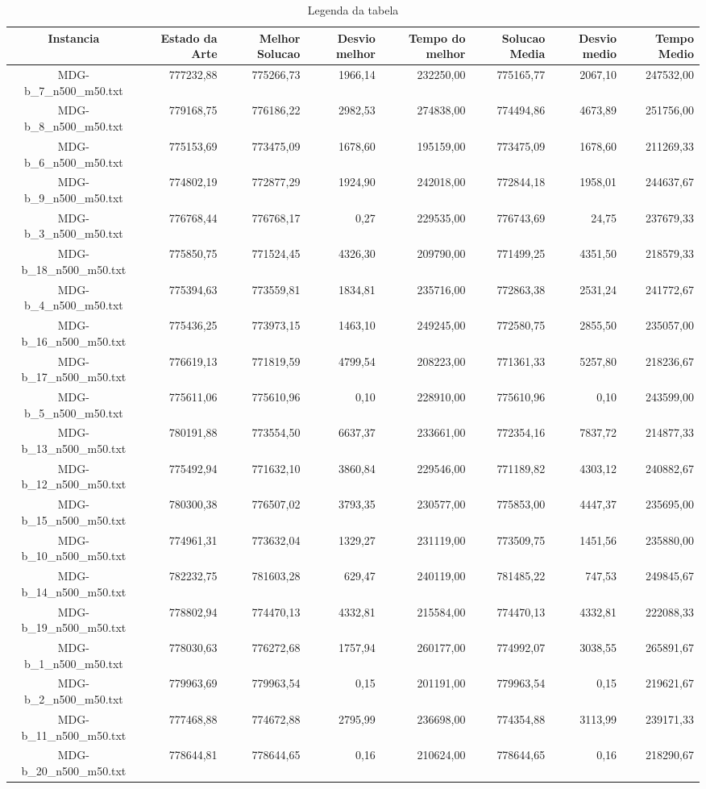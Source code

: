 \begin{landscape}
	\begin{table}[ht]
	\centering
	\begin{tabular}{| c | r | r | r | r | r | r | r |  }
\hline
Instancia&Estado da Arte&Melhor Solucao&Desvio melhor&Tempo do melhor&Solucao Media&Desvio medio&Tempo Medio\\ \hline 
		MDG-b\_7\_n500\_m50.txt&777232,88&775266,73&1966,14&232250,00&775165,77&2067,10&247532,00\\
		MDG-b\_8\_n500\_m50.txt&779168,75&776186,22&2982,53&274838,00&774494,86&4673,89&251756,00\\
		MDG-b\_6\_n500\_m50.txt&775153,69&773475,09&1678,60&195159,00&773475,09&1678,60&211269,33\\
		MDG-b\_9\_n500\_m50.txt&774802,19&772877,29&1924,90&242018,00&772844,18&1958,01&244637,67\\
		MDG-b\_3\_n500\_m50.txt&776768,44&776768,17&0,27&229535,00&776743,69&24,75&237679,33\\
		MDG-b\_18\_n500\_m50.txt&775850,75&771524,45&4326,30&209790,00&771499,25&4351,50&218579,33\\
		MDG-b\_4\_n500\_m50.txt&775394,63&773559,81&1834,81&235716,00&772863,38&2531,24&241772,67\\
		MDG-b\_16\_n500\_m50.txt&775436,25&773973,15&1463,10&249245,00&772580,75&2855,50&235057,00\\
		MDG-b\_17\_n500\_m50.txt&776619,13&771819,59&4799,54&208223,00&771361,33&5257,80&218236,67\\
		MDG-b\_5\_n500\_m50.txt&775611,06&775610,96&0,10&228910,00&775610,96&0,10&243599,00\\
		MDG-b\_13\_n500\_m50.txt&780191,88&773554,50&6637,37&233661,00&772354,16&7837,72&214877,33\\
		MDG-b\_12\_n500\_m50.txt&775492,94&771632,10&3860,84&229546,00&771189,82&4303,12&240882,67\\
		MDG-b\_15\_n500\_m50.txt&780300,38&776507,02&3793,35&230577,00&775853,00&4447,37&235695,00\\
		MDG-b\_10\_n500\_m50.txt&774961,31&773632,04&1329,27&231119,00&773509,75&1451,56&235880,00\\
		MDG-b\_14\_n500\_m50.txt&782232,75&781603,28&629,47&240119,00&781485,22&747,53&249845,67\\
		MDG-b\_19\_n500\_m50.txt&778802,94&774470,13&4332,81&215584,00&774470,13&4332,81&222088,33\\
		MDG-b\_1\_n500\_m50.txt&778030,63&776272,68&1757,94&260177,00&774992,07&3038,55&265891,67\\
		MDG-b\_2\_n500\_m50.txt&779963,69&779963,54&0,15&201191,00&779963,54&0,15&219621,67\\
		MDG-b\_11\_n500\_m50.txt&777468,88&774672,88&2795,99&236698,00&774354,88&3113,99&239171,33\\
		MDG-b\_20\_n500\_m50.txt&778644,81&778644,65&0,16&210624,00&778644,65&0,16&218290,67\\
\hline
	\end{tabular}
	\caption{Legenda da tabela}
	\label{seu_label}
	\end{table}
\end{landscape}
